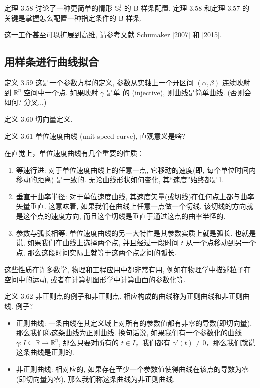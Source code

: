 \documentclass[a4paper]{ctexart}
\begin{document}
{定理 3.58 讨论了一种更简单的情形 $\mathbb{S}_2^1$ 的 B-样条配置. 定理
3.58 和定理 3.57 的关键是掌握怎么配置一种指定条件的 B-样条.

这一工作甚至可以扩展到高维, 请参考文献 Schumaker [2007] 和 [2015].

\subsection{用样条进行曲线拟合}

定义 3.59 这是一个参数方程的定义, 参数从实轴上一个开区间 $(\alpha,
\beta)$ 连续映射到 $\mathbb{R}^n$ 空间中一个点. 如果映射 $\gamma$ 是单
的 (injective), 则曲线是简单曲线. (否则会如何? 分叉...)

定义 3.60 切向量定义.

定义 3.61 单位速度曲线 (unit-speed curve), 直观意义是啥? 

在直觉上，单位速度曲线有几个重要的性质：

\begin{enumerate}
  \item 等速行进: 对于单位速度曲线上的任意一点, 它移动的速度(即, 每个单位时间内移动的距离) 是一致的. 无论曲线形状如何变化, 其“速度”始终都是1.
  \item 垂直于曲率半径: 对于单位速度曲线, 其速度矢量(或切线)在任何点上都与曲率矢量垂直. 这意味着, 
  如果我们在曲线上任意一点做一个切线, 该切线的方向就是这个点的速度方向, 而且这个切线是垂直于通过这点的曲率半径的.
  \item 参数与弧长相等: 单位速度曲线的另一大特性是其参数实质上就是弧长. 也就是说, 如果我们在曲线上选择两个点, 
  并且经过一段时间 $t$ 从一个点移动到另一个点, 那么这段时间实际上就等于这两个点之间的弧长.
\end{enumerate}

这些性质在许多数学, 物理和工程应用中都非常有用, 例如在物理学中描述粒子在空间中的运动, 或者在计算机图形学中计算曲面的参数化等. 

定义 3.62 非正则点的例子和非正则点. 相应构成的曲线称为正则曲线和非正则曲线. 例子?

\begin{itemize}
  \item 正则曲线: 一条曲线在其定义域上对所有的参数值都有非零的导数(即切向量), 那么我们称这条曲线为正则曲线. 
  换句话说, 如果我们有一个参数化的曲线 $\gamma: I \subseteq \mathbb{R} \rightarrow \mathbb{R}^n$, 
  那么只要对所有的 $t \in I$，我们都有 $\gamma'(t) \neq 0$，那么我们就说这条曲线是正则的.
  \item 非正则曲线: 相对应的, 如果存在至少一个参数值使得曲线在该点的导数为零(即切向量为零), 那么我们称这条曲线为非正则曲线.
\end{itemize}

}
\end{document}

